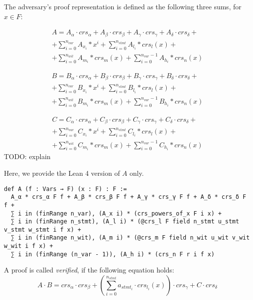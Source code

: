 \documentclass{article}
\theoremstyle{definition}
\theoremstyle{remark}
\begin{document}
The adversary's proof representation is defined as the following three sums, for $x \in F$:

\begin{multline}
A = A_{\alpha} \cdot crs_{\alpha} + A_{\beta} \cdot crs_{\beta} + A_{\gamma} \cdot crs_{\gamma} + A_{\delta} \cdot crs_{\delta} + \\
    + \sum \limits_{i = 0}^{n_{var}} A_{x_i} * x^i + \sum \limits_{i = 0}^{n_{stmt}} A_{l_i} * crs_l(x) + \\
    + \sum \limits_{i = 0}^{n_{wit}} A_{m_i} * crs_m(x) + \sum \limits_{i = 0}^{n_{var} - 1} A_{h_i} * crs_n(x)
\end{multline}

\begin{multline}
B = B_{\alpha} \cdot crs_{\alpha} + B_{\beta} \cdot crs_{\beta} + B_{\gamma} \cdot crs_{\gamma} + B_{\delta} \cdot crs_{\delta} + \\
    + \sum \limits_{i = 0}^{n_{var}} B_{x_i} * x^i + \sum \limits_{i = 0}^{n_{stmt}} B_{l_i} * crs_l(x) + \\
    + \sum \limits_{i = 0}^{n_{wit}} B_{m_i} * crs_m(x) + \sum \limits_{i = 0}^{n_{var} - 1} B_{h_i} * crs_n(x)
\end{multline}

\begin{multline}
C = C_{\alpha} \cdot crs_{\alpha} + C_{\beta} \cdot crs_{\beta} + C_{\gamma} \cdot crs_{\gamma} + C_{\delta} \cdot crs_{\delta} + \\
    + \sum \limits_{i = 0}^{n_{var}} C_{x_i} * x^i + \sum \limits_{i = 0}^{n_{stmt}} C_{l_i} * crs_l(x) + \\
    + \sum \limits_{i = 0}^{n_{wit}} C_{m_i} * crs_m(x) + \sum \limits_{i = 0}^{n_{var} - 1} C_{h_i} * crs_n(x)
\end{multline}
TODO: explain

Here, we provide the Lean 4 version of $A$ only.

\begin{lstlisting}
def A (f : Vars → F) (x : F) : F :=
  A_α * crs_α F f + A_β * crs_β F f + A_γ * crs_γ F f + A_δ * crs_δ F f +
  ∑ i in (finRange n_var), (A_x i) * (crs_powers_of_x F i x) +
  ∑ i in (finRange n_stmt), (A_l i) * (@crs_l F field n_stmt u_stmt v_stmt w_stmt i f x) +
  ∑ i in (finRange n_wit), (A_m i) * (@crs_m F field n_wit u_wit v_wit w_wit i f x) +
  ∑ i in (finRange (n_var - 1)), (A_h i) * (crs_n F r i f x)
\end{lstlisting}

A proof is called \emph{verified}, if the following equation holds:
\begin{equation}
A \cdot B = crs_{\alpha} \cdot crs_{\beta} + \left(\sum \limits_{i = 0}^{n_{stmt}} a_{{stmt}_i} \cdot crs_{l_i}(x) \right) \cdot crs_{\gamma} + C \cdot crs_{\delta}
\end{equation}
\end{document}

